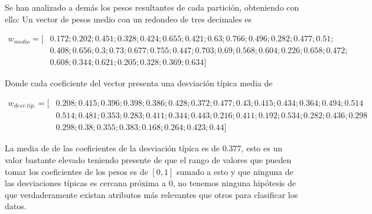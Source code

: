 Se han analizado a demás los pesos resultantes de cada partición, obteniendo con ello: 
Un vector de pesos medio con un redondeo de tres decimales es 

\begin{align*}
w_{medio} = [ 
  & 0.172; 0.202; 0.451; 0.328; 0.424; 0.655; 0.421; 0.63; 0.766; 0.496; 0.282; 0.477; 0.51;\\
 & 0.408; 0.656; 0.3; 0.73; 0.677; 0.755; 0.447;
  0.703; 0.69; 0.568; 0.604; 0.226; 0.658; 0.472; \\
 & 0.608; 0.344; 0.621; 0.205; 0.328; 0.369; 0.634
 ]
\end{align*}

Donde cada coeficiente del vector presenta una desviación típica media de 

\begin{align*}
  w_{desv. tip.} = [ 
    & 0.208; 0.415; 0.396; 0.398; 0.386; 0.428; 0.372; 0.477; 0.43; 0.415; 0.434; 0.364; 0.494; 0.514 \\
& 0.514; 0.481; 0.353; 0.283; 0.411; 0.344; 0.443; 0.216; 0.411; 0.192; 0.534; 0.282; 0.436; 0.298 \\
& 0.298; 0.38; 0.355; 0.383; 0.168; 0.264; 0.423; 0.44
   ]
  \end{align*}

  La media de de las coeficientes de la desviación típica es de $0.377$, esto es un valor bastante elevado teniendo presente de que el rango de valores que pueden tomar los coeficientes de los pesos es de $[0,1]$ sumado a esto y que ninguna de las desviaciones típicas es cercana próxima a $0$, no tenemos ninguna hipótesis de que verdaderamente existan atributos más relevantes que otros para clasificar los datos.




